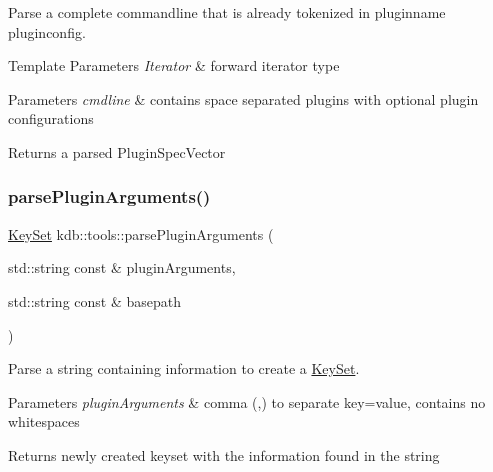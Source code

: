 Parse a complete commandline that is already tokenized in pluginname pluginconfig. 


\begin{DoxyTemplParams}{Template Parameters}
{\em Iterator} & forward iterator type\\
\hline
\end{DoxyTemplParams}

\begin{DoxyParams}{Parameters}
{\em cmdline} & contains space separated plugins with optional plugin configurations\\
\hline
\end{DoxyParams}
\begin{DoxyReturn}{Returns}
a parsed Plugin\+Spec\+Vector 
\end{DoxyReturn}
\mbox{\label{namespacekdb_1_1tools_ad4fdf9477ede38a219b02a7442965f6d}} 
\subsubsection{\texorpdfstring{parse\+Plugin\+Arguments()}{parsePluginArguments()}}
{\footnotesize\ttfamily \hyperlink{classkdb_1_1KeySet}{Key\+Set} kdb\+::tools\+::parse\+Plugin\+Arguments (\begin{DoxyParamCaption}\item[{std\+::string const \&}]{plugin\+Arguments,  }\item[{std\+::string const \&}]{basepath }\end{DoxyParamCaption})}



Parse a string containing information to create a \hyperlink{classkdb_1_1KeySet}{Key\+Set}. 


\begin{DoxyParams}{Parameters}
{\em plugin\+Arguments} & comma (,) to separate key=value, contains no whitespaces\\
\hline
\end{DoxyParams}
\begin{DoxyReturn}{Returns}
newly created keyset with the information found in the string 
\end{DoxyReturn}
